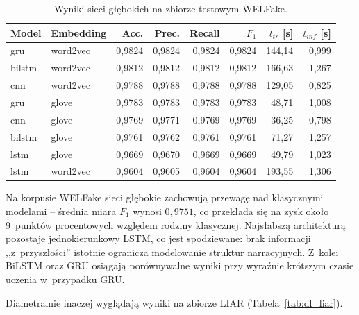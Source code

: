 \begin{table}[ht]
\centering
\caption{Wyniki sieci głębokich na zbiorze testowym WELFake.}
\label{tab:dl_welfake}
\begin{tabular}{llrrrrrr}
\toprule
Model & Embedding & Acc. & Prec. & Recall & $F_1$ & $t_{tr}$ [s] & $t_{inf}$ [s] \\
\midrule
gru    & word2vec & 0,9824 & 0,9824 & 0,9824 & 0,9824 & 144,14 & 0,999 \\
bilstm & word2vec & 0,9812 & 0,9812 & 0,9812 & 0,9812 & 166,63 & 1,267 \\
cnn    & word2vec & 0,9788 & 0,9788 & 0,9788 & 0,9788 & 129,05 & 0,825 \\
gru    & glove    & 0,9783 & 0,9783 & 0,9783 & 0,9783 & 48,71  & 1,008 \\
cnn    & glove    & 0,9769 & 0,9771 & 0,9769 & 0,9769 & 36,25  & 0,798 \\
bilstm & glove    & 0,9761 & 0,9762 & 0,9761 & 0,9761 & 71,27  & 1,257 \\
lstm   & glove    & 0,9669 & 0,9670 & 0,9669 & 0,9669 & 49,79  & 1,023 \\
lstm   & word2vec & 0,9604 & 0,9605 & 0,9604 & 0,9604 & 193,55 & 1,306 \\
\bottomrule
\end{tabular}
\end{table}

Na korpusie WELFake sieci głębokie zachowują przewagę nad klasycznymi
modelami -- średnia miara $F_1$ wynosi \(0{,}9751\), co przekłada się
na zysk około 9~punktów procentowych względem rodziny klasycznej.
Najsłabszą architekturą pozostaje jednokierunkowy LSTM, co jest
spodziewane: brak informacji ,,z~przyszłości'' istotnie ogranicza
modelowanie struktur narracyjnych. Z~kolei BiLSTM oraz GRU osiągają
porównywalne wyniki przy wyraźnie krótszym czasie uczenia w~przypadku
GRU.

Diametralnie inaczej wyglądają wyniki na zbiorze LIAR
(Tabela~\ref{tab:dl_liar}).

